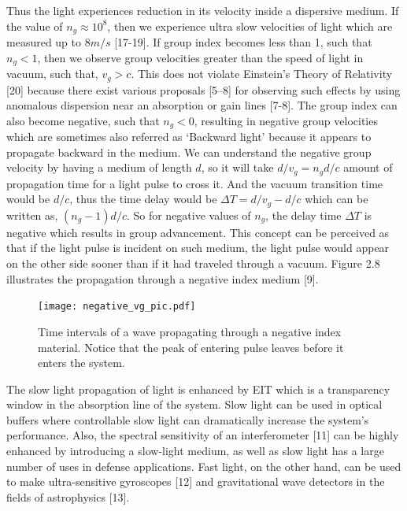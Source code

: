 Thus the light experiences reduction in its velocity inside a dispersive medium. If the value of $n_{g} \approx 10^{8}$, then we experience ultra slow velocities of light which are measured up to $8m/s$ [17-19]. If group index becomes less than 1, such that $n_{g} < 1$, then we observe group velocities greater than the speed of light in vacuum, such that, $v_{g} > c$. This does not violate Einstein's Theory of Relativity [20] because there exist various proposals [5–8] for observing such effects by using anomalous dispersion near an absorption or gain lines [7-8]. The group index can also become negative, such that $n_{g} < 0$, resulting in negative group velocities which are sometimes also referred as `Backward light' because it appears to propagate backward in the medium. We can understand the negative group velocity by having a medium of length $d$, so it will take $d/v_{g} = n_{g}d/c$ amount of propagation time for a light pulse to cross it. And the vacuum transition time would be $d/c$, thus the time delay would be $\Delta T = d/v_{g} - d/c$ which can be written as, $(n_{g}-1)d/c$. So for negative values of $n_{g}$, the delay time $\Delta T$ is negative which results in group advancement. This concept can be perceived as that if the light pulse is incident on such medium, the light pulse would appear on the other side sooner than if it had traveled through a vacuum. Figure 2.8 illustrates the propagation through a negative index medium [9]. 

\begin{figure}[h]
\centering
\texttt{[image: negative\_vg\_pic.pdf]}
\caption{Time intervals of a wave propagating through a negative index material. Notice that the peak of entering pulse leaves before it enters the system.}
\end{figure}

The slow light propagation of light is enhanced by EIT which is a transparency window in the absorption line of the system. Slow light can be used in optical buffers where controllable slow light can dramatically increase the system's performance. Also, the spectral sensitivity of an interferometer [11] can be highly enhanced by introducing a slow-light medium, as well as slow light has a large number of uses in defense applications. Fast light, on the other hand, can be used to make ultra-sensitive gyroscopes [12] and gravitational wave detectors in the fields of astrophysics [13].



